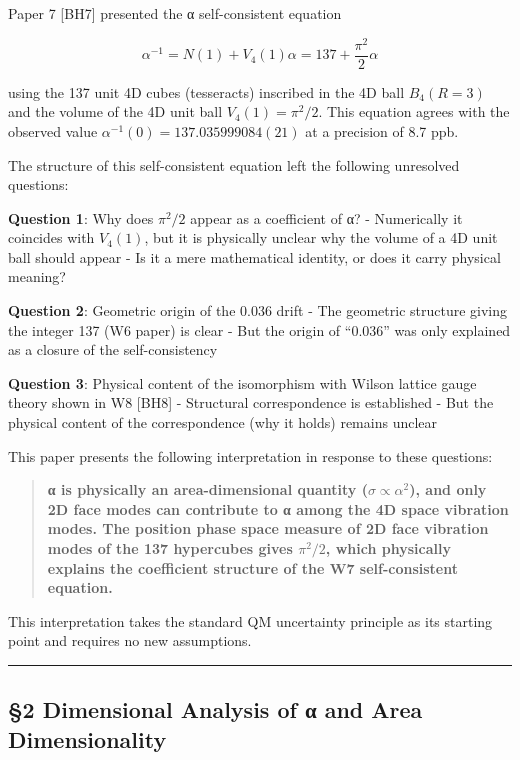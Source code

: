 \documentclass[
  11pt]{article}
\begin{document}
Paper 7 {[}BH7{]} presented the α self-consistent equation

\[\alpha^{-1} = N(1) + V_4(1)\alpha = 137 + \frac{\pi^2}{2}\alpha\]

using the 137 unit 4D cubes (tesseracts) inscribed in the 4D ball
\(B_4(R=3)\) and the volume of the 4D unit ball \(V_4(1) = \pi^2/2\).
This equation agrees with the observed value
\(\alpha^{-1}(0) = 137.035999084(21)\) at a precision of 8.7 ppb.

The structure of this self-consistent equation left the following
unresolved questions:

\textbf{Question 1}: Why does \(\pi^2/2\) appear as a coefficient of α?
- Numerically it coincides with \(V_4(1)\), but it is physically unclear
why the volume of a 4D unit ball should appear - Is it a mere
mathematical identity, or does it carry physical meaning?

\textbf{Question 2}: Geometric origin of the 0.036 drift - The geometric
structure giving the integer 137 (W6 paper) is clear - But the origin of
``0.036'' was only explained as a closure of the self-consistency

\textbf{Question 3}: Physical content of the isomorphism with Wilson
lattice gauge theory shown in W8 {[}BH8{]} - Structural correspondence
is established - But the physical content of the correspondence (why it
holds) remains unclear

This paper presents the following interpretation in response to these
questions:

\begin{quote}
\textbf{α is physically an area-dimensional quantity
(\(\sigma \propto \alpha^2\)), and only 2D face modes can contribute to
α among the 4D space vibration modes. The position phase space measure
of 2D face vibration modes of the 137 hypercubes gives \(\pi^2/2\),
which physically explains the coefficient structure of the W7
self-consistent equation.}
\end{quote}

This interpretation takes the standard QM uncertainty principle as its
starting point and requires no new assumptions.

\begin{center}\rule{0.5\linewidth}{0.5pt}\end{center}

\subsection{§2 Dimensional Analysis of α and Area
Dimensionality}\label{dimensional-analysis-of-ux3b1-and-area-dimensionality}
\end{document}
